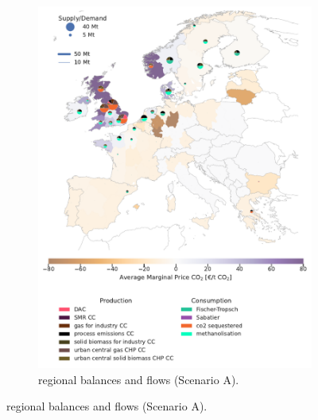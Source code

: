 \documentclass[final,5p,times,twocolumn]{elsarticle}
\begin{document}
\begin{figure}[!htbp]
\begin{subfigure}[t]{0.47\textwidth}
      \includegraphics[width=\textwidth]{balance_map_co2_scenario_a}
      \vspace{-0.7cm}
      \caption{ regional balances and flows (Scenario A).}
      \label{fig:balance_map_co2_scenario_a}
  \end{subfigure}

  \vspace{0.2cm} %


\end{figure}
\end{document}
